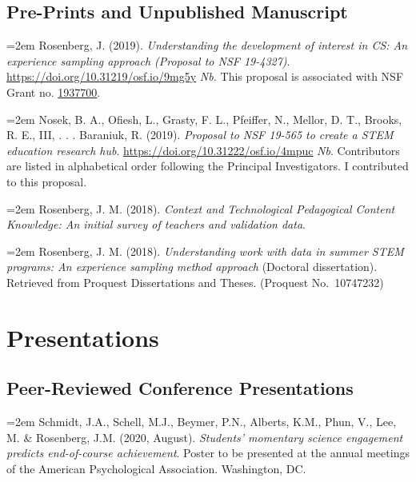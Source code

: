 \documentclass[
  11pt,
]{article}
\begin{document}
\hypertarget{pre-prints-and-unpublished-manuscript}{%
\subsection{Pre-Prints and Unpublished
Manuscript}\label{pre-prints-and-unpublished-manuscript}}

\hangindent=2em Rosenberg, J. (2019). \emph{Understanding the
development of interest in CS: An experience sampling approach (Proposal
to NSF 19-4327)}. \url{https://doi.org/10.31219/osf.io/9mg5y} \emph{Nb.}
This proposal is associated with NSF Grant no.
\href{https://www.nsf.gov/awardsearch/showAward?AWD_ID=1937700\&HistoricalAwards=false}{1937700}.

\hangindent=2em Nosek, B. A., Ofiesh, L., Grasty, F. L., Pfeiffer, N.,
Mellor, D. T., Brooks, R. E., III, . . . Baraniuk, R. (2019).
\emph{Proposal to NSF 19-565 to create a STEM education research hub}.
\url{https://doi.org/10.31222/osf.io/4mpuc} \emph{Nb}. Contributors are
listed in alphabetical order following the Principal Investigators. I
contributed to this proposal.

\hangindent=2em Rosenberg, J. M. (2018). \emph{Context and Technological
Pedagogical Content Knowledge: An initial survey of teachers and
validation data}.

\hangindent=2em Rosenberg, J. M. (2018). \emph{Understanding work with
data in summer STEM programs: An experience sampling method approach}
(Doctoral dissertation). Retrieved from Proquest Dissertations and
Theses. (Proquest No.~10747232)

\hypertarget{presentations}{%
\section{Presentations}\label{presentations}}

\hypertarget{peer-reviewed-conference-presentations}{%
\subsection{Peer-Reviewed Conference
Presentations}\label{peer-reviewed-conference-presentations}}

\hangindent=2em Schmidt, J.A., Schell, M.J., Beymer, P.N., Alberts,
K.M., Phun, V., Lee, M. \& Rosenberg, J.M. (2020, August).
\emph{Students' momentary science engagement predicts end-of-course
achievement}. Poster to be presented at the annual meetings of the
American Psychological Association. Washington, DC.
\end{document}

